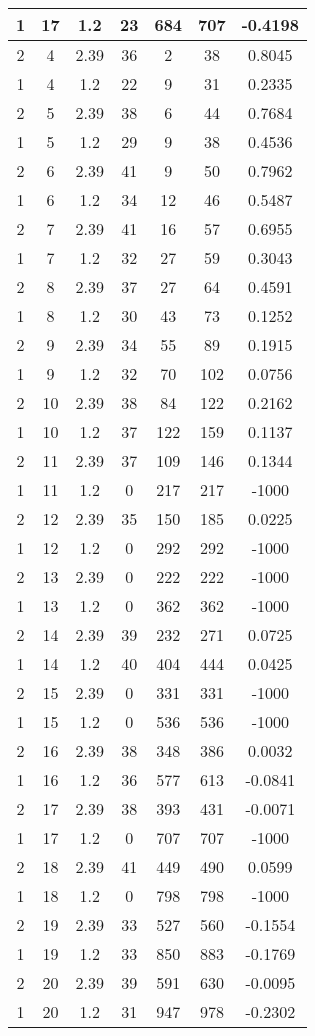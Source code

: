 \documentclass[letterpaper, 12pt]{article}
\begin{document}
\begin{longtable}{|c|c|c|c|c|c|c|}
\hline
1 & 17 & 1.2 & 23 & 684 & 707 & -0.4198 \\
\hline
2 & 4 & 2.39 & 36 & 2 & 38 & 0.8045 \\
\hline
1 & 4 & 1.2 & 22 & 9 & 31 & 0.2335 \\
\hline
2 & 5 & 2.39 & 38 & 6 & 44 & 0.7684 \\
\hline
1 & 5 & 1.2 & 29 & 9 & 38 & 0.4536 \\
\hline
2 & 6 & 2.39 & 41 & 9 & 50 & 0.7962 \\
\hline
1 & 6 & 1.2 & 34 & 12 & 46 & 0.5487 \\
\hline
2 & 7 & 2.39 & 41 & 16 & 57 & 0.6955 \\
\hline
1 & 7 & 1.2 & 32 & 27 & 59 & 0.3043 \\
\hline
2 & 8 & 2.39 & 37 & 27 & 64 & 0.4591 \\
\hline
1 & 8 & 1.2 & 30 & 43 & 73 & 0.1252 \\
\hline
2 & 9 & 2.39 & 34 & 55 & 89 & 0.1915 \\
\hline
1 & 9 & 1.2 & 32 & 70 & 102 & 0.0756 \\
\hline
2 & 10 & 2.39 & 38 & 84 & 122 & 0.2162 \\
\hline
1 & 10 & 1.2 & 37 & 122 & 159 & 0.1137 \\
\hline
2 & 11 & 2.39 & 37 & 109 & 146 & 0.1344 \\
\hline
1 & 11 & 1.2 & 0 & 217 & 217 & -1000 \\
\hline
2 & 12 & 2.39 & 35 & 150 & 185 & 0.0225 \\
\hline
1 & 12 & 1.2 & 0 & 292 & 292 & -1000 \\
\hline
2 & 13 & 2.39 & 0 & 222 & 222 & -1000 \\
\hline
1 & 13 & 1.2 & 0 & 362 & 362 & -1000 \\
\hline
2 & 14 & 2.39 & 39 & 232 & 271 & 0.0725 \\
\hline
1 & 14 & 1.2 & 40 & 404 & 444 & 0.0425 \\
\hline
2 & 15 & 2.39 & 0 & 331 & 331 & -1000 \\
\hline
1 & 15 & 1.2 & 0 & 536 & 536 & -1000 \\
\hline
2 & 16 & 2.39 & 38 & 348 & 386 & 0.0032 \\
\hline
1 & 16 & 1.2 & 36 & 577 & 613 & -0.0841 \\
\hline
2 & 17 & 2.39 & 38 & 393 & 431 & -0.0071 \\
\hline
1 & 17 & 1.2 & 0 & 707 & 707 & -1000 \\
\hline
2 & 18 & 2.39 & 41 & 449 & 490 & 0.0599 \\
\hline
1 & 18 & 1.2 & 0 & 798 & 798 & -1000 \\
\hline
2 & 19 & 2.39 & 33 & 527 & 560 & -0.1554 \\
\hline
1 & 19 & 1.2 & 33 & 850 & 883 & -0.1769 \\
\hline
2 & 20 & 2.39 & 39 & 591 & 630 & -0.0095 \\
\hline
1 & 20 & 1.2 & 31 & 947 & 978 & -0.2302 \\
\hline
\end{longtable}
\end{document}
